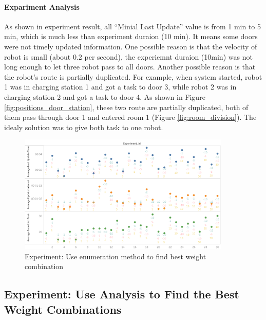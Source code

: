 \paragraph{Expariment Analysis} 

As shown in experiment result, all ``Minial Last Update'' value is from 1 min to 5 min, which is much less than experiment duraion (10 min). It means some doors were not timely updated information. One possible reason is that the velocity of robot is small (about 0.2 per second), the experiemnt duraion (10min) was not long enough to let three robot pass to all doors. Another possible reason is that the robot's route is partially duplicated. For example, when system started, robot 1 was in charging station 1 and got a task to door 3, while robot 2 was in charging station 2 and got a task to door 4. As shown in Figure \ref{fig:positions_door_station}, these two route are partially duplicated, both of them pass through door 1 and entered room 1 (Figure \ref{fig:room_division}). The idealy solution was to give both task to one robot. 

\begin{figure}[htbp]
    \centering
    \includegraphics[width = 0.9\textwidth]{content/images/ch5/enviroment_enumerate.png}
    \caption{Experiment: Use enumeration method to find best weight combination}
    \label{fig:enviroment_experiment_enumerate}
\end{figure}


\subsection{Experiment: Use Analysis to Find the Best Weight Combinations}

